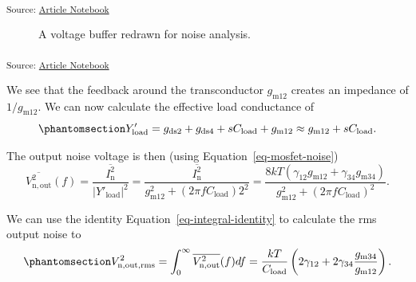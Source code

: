 \documentclass[
  a4paper,
  DIV=11,
  numbers=noendperiod]{scrartcl}
\begin{document}
\textsubscript{Source:
\href{https://iic-jku.github.io/analog-circuit-design/index.qmd.html}{Article
Notebook}}

\begin{figure}[H]


\caption{\label{fig-voltage-buffer-ota-noise}A voltage buffer redrawn
for noise analysis.}

\end{figure}%

\textsubscript{Source:
\href{https://iic-jku.github.io/analog-circuit-design/index.qmd.html}{Article
Notebook}}

We see that the feedback around the transconductor \(g_\mathrm{m12}\)
creates an impedance of \(1/g_\mathrm{m12}\). We can now calculate the
effective load conductance of
\begin{equation}\phantomsection\label{eq-basic-ota-output-noise-yload}{
Y'_\mathrm{load} = g_\mathrm{ds2} + g_\mathrm{ds4} + s C_\mathrm{load} + g_\mathrm{m12} \approx g_\mathrm{m12} + s C_\mathrm{load}.
}\end{equation}

The output noise voltage is then (using Equation~\ref{eq-mosfet-noise})
\[
\overline{V_\mathrm{n,out}^2}(f) = \frac{\overline{I_\mathrm{n}^2}}{|Y'_\mathrm{load}|^2} = \frac{\overline{I_\mathrm{n}^2}}{g_\mathrm{m12}^2 + (2 \pi f C_\mathrm{load})2^2} = \frac{8 k T (\gamma_{12} g_\mathrm{m12} + \gamma_{34} g_\mathrm{m34})}{g_\mathrm{m12}^2 + (2 \pi f C_\mathrm{load})^2}.
\]

We can use the identity Equation~\ref{eq-integral-identity} to calculate
the rms output noise to
\begin{equation}\phantomsection\label{eq-basic-ota-output-noise}{
V_\mathrm{n,out,rms}^2 = \int_0^\infty \overline{V_\mathrm{n,out}^2}(f) df = \frac{k T}{C_\mathrm{load}} \left( 2 \gamma_{12} + 2 \gamma_{34} \frac{g_\mathrm{m34}}{g_\mathrm{m12}} \right).
}\end{equation}
\end{document}
